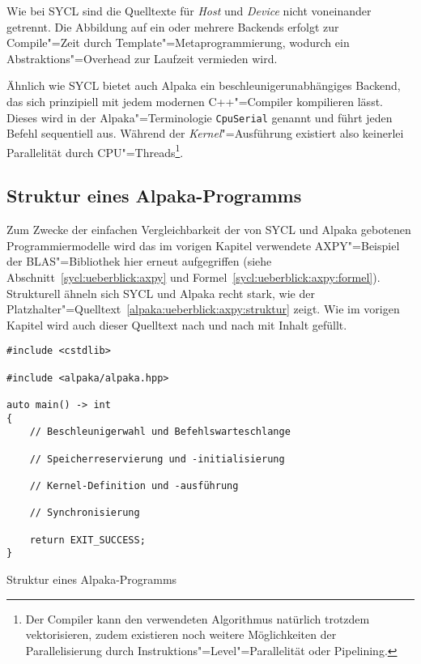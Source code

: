 Wie bei SYCL sind die Quelltexte für \textit{Host} und \textit{Device} nicht
voneinander getrennt. Die Abbildung auf ein oder mehrere Backends erfolgt zur
Compile"=Zeit durch Template"=Metaprogrammierung, wodurch ein
Abstraktions"=Overhead zur Laufzeit vermieden wird.

Ähnlich wie SYCL bietet auch Alpaka ein beschleunigerunabhängiges Backend, das
sich prinzipiell mit jedem modernen C++"=Compiler kompilieren lässt. Dieses
wird in der Alpaka"=Terminologie \texttt{CpuSerial} genannt und führt jeden
Befehl sequentiell aus. Während der \textit{Kernel}"=Ausführung existiert also keinerlei
Parallelität durch CPU"=Threads\footnote{Der Compiler kann den verwendeten
Algorithmus natürlich trotzdem vektorisieren, zudem existieren noch weitere
Möglichkeiten der Parallelisierung durch Instruktions"=Level"=Parallelität oder
Pipelining.}.

\subsection{Struktur eines Alpaka-Programms}
\label{alpaka:ueberblick:axpy}

Zum Zwecke der einfachen Vergleichbarkeit der von SYCL und Alpaka gebotenen
Programmiermodelle wird das im vorigen Kapitel verwendete AXPY"=Beispiel der
BLAS"=Bibliothek hier erneut aufgegriffen (siehe
Abschnitt~\ref{sycl:ueberblick:axpy} und
Formel~\ref{sycl:ueberblick:axpy:formel}). Strukturell ähneln sich SYCL und
Alpaka recht stark, wie der
Platzhalter"=Quelltext~\ref{alpaka:ueberblick:axpy:struktur} zeigt. Wie im
vorigen Kapitel wird auch dieser Quelltext nach und nach mit Inhalt gefüllt.

\begin{code}
    \begin{verbatim}
#include <cstdlib>

#include <alpaka/alpaka.hpp>

auto main() -> int
{
    // Beschleunigerwahl und Befehlswarteschlange

    // Speicherreservierung und -initialisierung

    // Kernel-Definition und -ausführung

    // Synchronisierung

    return EXIT_SUCCESS;
}
    \end{verbatim}
    \caption{Struktur eines Alpaka-Programms}
    \label{alpaka:ueberblick:axpy:struktur}
\end{code}

